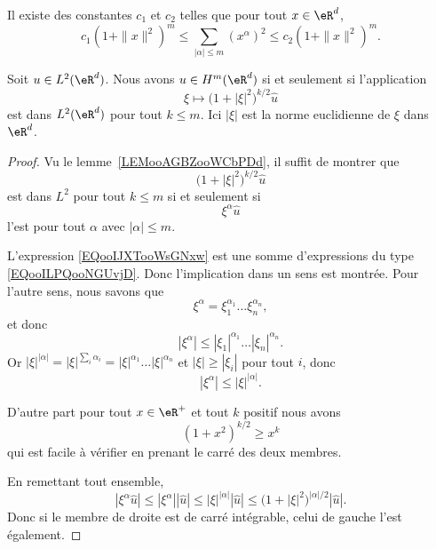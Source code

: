 \begin{lemma}
	Il existe des constantes \( c_1\) et \( c_2\) telles que pour tout \( x\in \eR^d\),
	\begin{equation}
		c_1(1+\| x \|^2)^m\leq \sum_{| \alpha |\leq m}(x^{\alpha})^2\leq c_2(1+\| x \|^2)^m.
	\end{equation}
\end{lemma}

\begin{lemma}
	Soit \( u\in L^2(\eR^d)\). Nous avons \( u\in H^m(\eR^d)\) si et seulement si l'application
	\begin{equation}
		\xi\mapsto \big( 1+| \xi |^2 \big)^{k/2}\hat u
	\end{equation}
	est dans \( L^2(\eR^d)\) pour tout \( k\leq m\). Ici \( | \xi |\) est la norme euclidienne de \( \xi\) dans \( \eR^d\).
\end{lemma}

\begin{proof}
	Vu le lemme~\ref{LEMooAGBZooWCbPDd}, il suffit de montrer que
	\begin{equation}        \label{EQooIJXTooWsGNxw}
		\big( 1+| \xi |^2 \big)^{k/2}\hat u
	\end{equation}
	est dans \( L^2\) pour tout \( k\leq m\) si et seulement si
	\begin{equation}        \label{EQooILPQooNGUvjD}
		\xi^{\alpha}\hat u
	\end{equation}
	l'est pour tout \( \alpha\) avec \( | \alpha |\leq m\).

	L'expression \eqref{EQooIJXTooWsGNxw} est une somme d'expressions du type \eqref{EQooILPQooNGUvjD}. Donc l'implication dans un sens est montrée. Pour l'autre sens, nous savons que
	\begin{equation}
		\xi^{\alpha}=\xi_1^{\alpha_1}\ldots \xi_n^{\alpha_n},
	\end{equation}
	et donc
	\begin{equation}
		| \xi^{\alpha} |\leq | \xi_1 |^{\alpha_1}\ldots | \xi_n |^{\alpha_n}.
	\end{equation}
	Or \( | \xi |^{| \alpha |}=| \xi |^{\sum_i\alpha_i}=| \xi |^{\alpha_1}\ldots | \xi |^{\alpha_n}\) et \( | \xi |\geq | \xi_i |\) pour tout \( i\), donc
	\begin{equation}
		| \xi^{\alpha} |\leq | \xi |^{| \alpha |}.
	\end{equation}

	D'autre part pour tout \( x\in \eR^+\) et tout \( k\) positif nous avons
	\begin{equation}
		(1+x^2)^{k/2}\geq x^k
	\end{equation}
	qui est facile à vérifier en prenant le carré des deux membres.

	En remettant tout ensemble,
	\begin{equation}
		| \xi^{\alpha}\hat u |\leq | \xi^{\alpha} | |\hat u |\leq | \xi |^{| \alpha |}| \hat u |\leq \big( 1+| \xi |^2 \big)^{| \alpha |/2}| \hat u |.
	\end{equation}
	Donc si le membre de droite est de carré intégrable, celui de gauche l'est également.
\end{proof}

